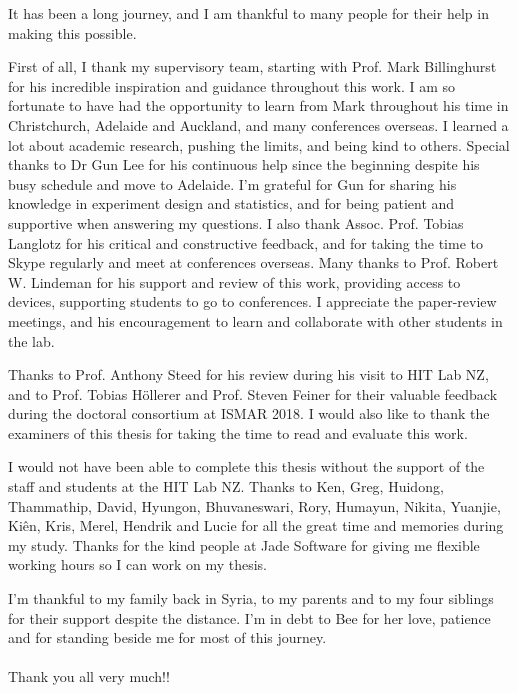 \begin{acknowledgements}
\addchaptertocentry{\acknowledgementname} %
It has been a long journey, and I am thankful to many people for their help in making this possible.

First of all, I thank my supervisory team, starting with Prof. Mark Billinghurst for his incredible inspiration and guidance throughout this work. I am so fortunate to have had the opportunity to learn from Mark throughout his time in Christchurch, Adelaide and Auckland, and many conferences overseas. I learned a lot about academic research, pushing the limits, and being kind to others. 
Special thanks to Dr Gun Lee for his continuous help since the beginning despite his busy schedule and move to Adelaide. I'm grateful for Gun for sharing his knowledge in experiment design and statistics, and for being patient and supportive when answering my questions. 
I also thank Assoc. Prof. Tobias Langlotz for his critical and constructive feedback, and for taking the time to Skype regularly and meet at conferences overseas.
Many thanks to Prof. Robert W. Lindeman for his support and review of this work, providing access to devices, supporting students to go to conferences. I appreciate the paper-review meetings, and his encouragement to learn and collaborate with other students in the lab. 

Thanks to Prof. Anthony Steed for his review during his visit to HIT Lab NZ, and to Prof. Tobias Höllerer and Prof. Steven Feiner for their valuable feedback during the doctoral consortium at ISMAR 2018. I would also like to thank the examiners of this thesis for taking the time to read and evaluate this work. 

I would not have been able to complete this thesis without the support of the staff and students at the HIT Lab NZ. Thanks to Ken, Greg, Huidong, Thammathip, David, Hyungon, Bhuvaneswari, Rory, Humayun, Nikita, Yuanjie, Kiên, Kris, Merel, Hendrik and Lucie for all the great time and memories during my study. Thanks for the kind people at Jade Software for giving me flexible working hours so I can work on my thesis.

I'm thankful to my family back in Syria, to my parents and to my four siblings for their support despite the distance. I'm in debt to Bee for her love, patience and for standing beside me for most of this journey. 
\\
\\
Thank you all very much!!

\end{acknowledgements}